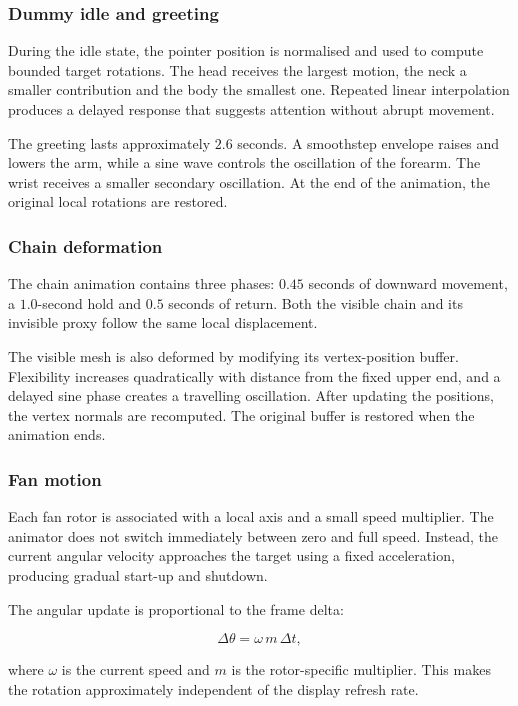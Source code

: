 \documentclass{report}
\begin{document}
\subsubsection{Dummy idle and greeting}

During the idle state, the pointer position is normalised and used to
compute bounded target rotations. The head receives the largest motion,
the neck a smaller contribution and the body the smallest one. Repeated
linear interpolation produces a delayed response that suggests attention
without abrupt movement.

The greeting lasts approximately \(2.6\) seconds. A smoothstep envelope
raises and lowers the arm, while a sine wave controls the oscillation of
the forearm. The wrist receives a smaller secondary oscillation. At the
end of the animation, the original local rotations are restored.

\subsubsection{Chain deformation}

The chain animation contains three phases: \(0.45\) seconds of downward
movement, a \(1.0\)-second hold and \(0.5\) seconds of return. Both the
visible chain and its invisible proxy follow the same local displacement.

The visible mesh is also deformed by modifying its vertex-position
buffer. Flexibility increases quadratically with distance from the fixed
upper end, and a delayed sine phase creates a travelling oscillation.
After updating the positions, the vertex normals are recomputed. The
original buffer is restored when the animation ends.

\subsubsection{Fan motion}

Each fan rotor is associated with a local axis and a small speed
multiplier. The animator does not switch immediately between zero and
full speed. Instead, the current angular velocity approaches the target
using a fixed acceleration, producing gradual start-up and shutdown.

The angular update is proportional to the frame delta:

\[
\Delta \theta
=
\omega\,m\,\Delta t,
\]

where \(\omega\) is the current speed and \(m\) is the rotor-specific
multiplier. This makes the rotation approximately independent of the
display refresh rate.
\end{document}
